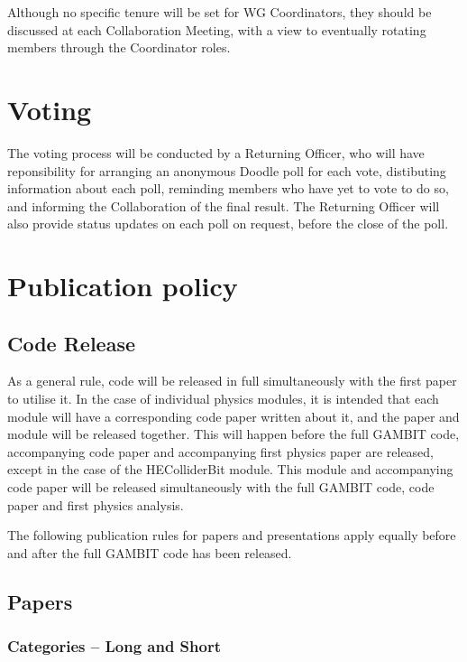 Although no specific tenure will be set for WG Coordinators, they should be discussed at each Collaboration Meeting, with a view to eventually rotating members through the Coordinator roles.

\section{Voting}

The voting process will be conducted by a Returning Officer, who will have reponsibility for arranging an anonymous Doodle poll for each vote, distibuting information about each poll, reminding members who have yet to vote to do so, and informing the Collaboration of the final result.  The Returning Officer will also provide status updates on each poll on request, before the close of the poll.

\section{Publication policy}

\subsection{Code Release}

As a general rule, code will be released in full simultaneously with the first paper to utilise it.  In the case of individual physics modules, it is intended that each module will have a corresponding code paper written about it, and the paper and module will be released together.  This will happen before the full GAMBIT code, accompanying code paper and accompanying first physics paper are released, except in the case of the HEColliderBit module.  This module and accompanying code paper will be released simultaneously with the full GAMBIT code, code paper and first physics analysis.

The following publication rules for papers and presentations apply equally before and after the full GAMBIT code has been released.

\subsection{Papers}

\subsubsection{Categories -- Long and Short}

